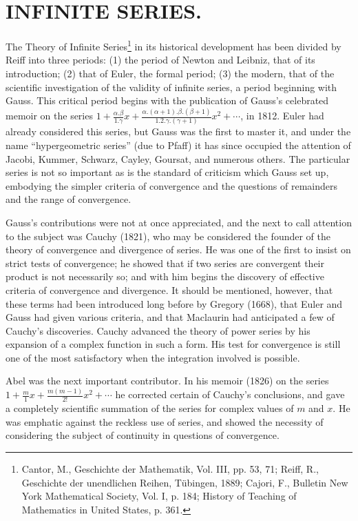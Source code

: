 \documentclass[oneside]{book}
\begin{document}
\chapter{INFINITE SERIES.}

The Theory of Infinite Series\footnote{Cantor, M., Geschichte der
Mathematik, Vol. III, pp. 53, 71; Reiff, R., Geschichte der
unendlichen Reihen, T\"ubingen, 1889; Cajori, F., Bulletin New York
Mathematical Society, Vol. I, p. 184; History of Teaching of
Mathematics in United States, p. 361.} in its historical
development has been divided by Reiff into three periods: (1) the
period of Newton and Leibniz, that of its introduction; (2) that of
Euler, the formal period; (3) the modern, that of the scientific
investigation of the validity of infinite series, a period beginning
with Gauss. This critical period begins with the publication of
Gauss's celebrated memoir on the series $1 +
\frac{\alpha.\beta}{1.\gamma}x +
\frac{\alpha.(\alpha+1).\beta.(\beta+1)}{1.2.\gamma.(\gamma+1)}x^2 +
\cdots$, in 1812. Euler had already considered this series, but Gauss
was the first to master it, and under the name ``hypergeometric
series'' (due to Pfaff) it has since occupied the attention of
Jacobi, Kummer, Schwarz, Cayley, Goursat, and numerous others. The
particular series is not so important as is the standard of
criticism which Gauss set up, embodying the simpler criteria of
convergence and the questions of remainders and the range of
convergence.

Gauss's contributions were not at once appreciated, and the next to
call attention to the subject was Cauchy (1821), who may be
considered the founder of the theory of convergence and divergence
of series. He was one of the first to insist on strict tests of
convergence; he showed that if two series are convergent their
product is not necessarily so; and with him begins the discovery of
effective criteria of convergence and divergence. It should be
mentioned, however, that these terms had been introduced long before
by Gregory (1668), that Euler and Gauss had given various criteria,
and that Maclaurin had anticipated a few of Cauchy's discoveries.
Cauchy advanced the theory of power series by his expansion of a
complex function in such a form. His test for convergence is still
one of the most satisfactory when the integration involved is
possible.

Abel was the next important contributor. In his memoir (1826) on the
series $1 + \frac{m}{1}x + \frac{m(m-1)}{2!}x^2 + \cdots$ he
corrected certain of Cauchy's conclusions, and gave a completely
scientific summation of the series for complex values of $m$ and $x$.
He was emphatic against the reckless use of series, and showed the
necessity of considering the subject of continuity in questions of
convergence.
\end{document}
